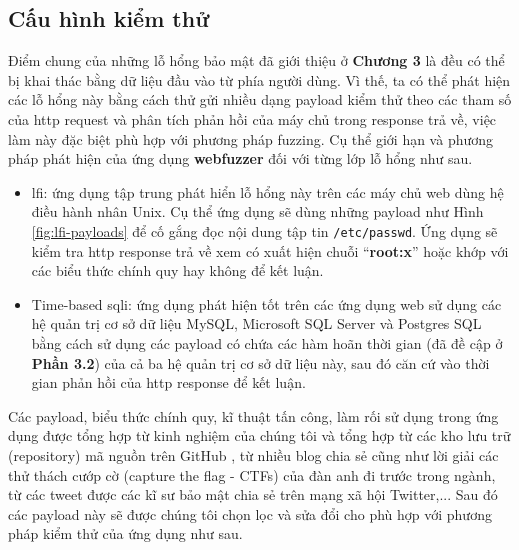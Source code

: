 \subsection{Cấu hình kiểm thử}
Điểm chung của những lỗ hổng bảo mật đã giới thiệu ở \textbf{Chương 3} là đều có thể bị khai thác bằng dữ liệu đầu vào từ phía người dùng. Vì thế, ta có thể phát hiện các lỗ hổng này bằng cách thử gửi nhiều dạng payload kiểm thử theo các tham số của \acrshort{http} request và phân tích phản hồi của máy chủ trong response trả về, việc làm này đặc biệt phù hợp với phương pháp fuzzing. Cụ thể giới hạn và phương pháp phát hiện của ứng dụng \textbf{webfuzzer} đối với từng lớp lỗ hổng như sau.
\begin{itemize}
    \item \acrshort{lfi}: ứng dụng tập trung phát hiển lỗ hổng này trên các máy chủ web dùng hệ điều hành nhân Unix. Cụ thể ứng dụng sẽ dùng những payload như Hình \ref{fig:lfi-payloads} để cố gắng đọc nội dung tập tin \texttt{/etc/passwd}. Ứng dụng sẽ kiểm tra \acrshort{http} response trả về xem có xuất hiện chuỗi ``\textbf{root:x}'' hoặc khớp với các biểu thức chính quy hay không để kết luận.
    \item Time-based \acrshort{sqli}: ứng dụng phát hiện tốt trên các ứng dụng web sử dụng các hệ quản trị cơ sở dữ liệu MySQL, Microsoft SQL Server và Postgres SQL bằng cách sử dụng các payload có chứa các hàm hoãn thời gian (đã đề cập ở \textbf{Phần 3.2}) của cả ba hệ quản trị cơ sở dữ liệu này, sau đó căn cứ vào thời gian phản hồi của \acrshort{http} response để kết luận.
\end{itemize}
Các payload, biểu thức chính quy, kĩ thuật tấn công, làm rối sử dụng trong ứng dụng được tổng hợp từ kinh nghiệm của chúng tôi và tổng hợp từ các kho lưu trữ (repository) mã nguồn trên GitHub \parencite{seclist-fuzzing,0verpwn-fuzzing}, từ nhiều blog chia sẻ cũng như lời giải các thử thách cướp cờ (capture the flag - CTFs) của đàn anh đi trước trong ngành, từ các tweet được các kĩ sư bảo mật chia sẻ trên mạng xã hội Twitter,... Sau đó các payload này sẽ được chúng tôi chọn lọc và sửa đổi cho phù hợp với phương pháp kiểm thử của ứng dụng như sau.
